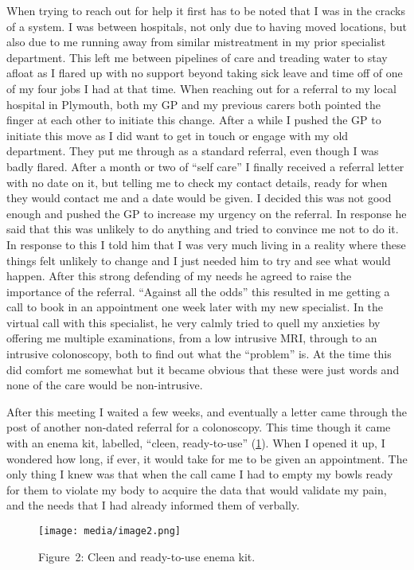 When trying to reach out for help it first has to be noted that I was in
the cracks of a system. I was between hospitals, not only due to having
moved locations, but also due to me running away from similar
mistreatment in my prior specialist department. This left me between
pipelines of care and treading water to stay afloat as I flared up with
no support beyond taking sick leave and time off of one of my four jobs
I had at that time. When reaching out for a referral to my local
hospital in Plymouth, both my GP and my previous carers both pointed the
finger at each other to initiate this change. After a while I pushed the
GP to initiate this move as I did want to get in touch or engage with my
old department. They put me through as a standard referral, even though
I was badly flared. After a month or two of ``self care'' I finally
received a referral letter with no date on it, but telling me to check
my contact details, ready for when they would contact me and a date
would be given. I decided this was not good enough and pushed the GP to
increase my urgency on the referral. In response he said that this was
unlikely to do anything and tried to convince me not to do it. In
response to this I told him that I was very much living in a reality
where these things felt unlikely to change and I just needed him to try
and see what would happen. After this strong defending of my needs he
agreed to raise the importance of the referral. ``Against all the odds''
this resulted in me getting a call to book in an appointment one week
later with my new specialist. In the virtual call with this specialist,
he very calmly tried to quell my anxieties by offering me multiple
examinations, from a low intrusive MRI, through to an intrusive
colonoscopy, both to find out what the ``problem'' is. At the time this
did comfort me somewhat but it became obvious that these were just words
and none of the care would be non-intrusive.

After this meeting I waited a few weeks, and eventually a letter came
through the post of another non-dated referral for a colonoscopy. This
time though it came with an enema kit, labelled, ``cleen, ready-to-use''
(\cref{fig:cleen}). When I opened it up, I wondered how long, if ever,
it would take for me to be given an appointment. The only thing I knew
was that when the call came I had to empty my bowls ready for them to
violate my body to acquire the data that would validate my pain, and the
needs that I had already informed them of verbally.

\begin{figure}
\hypertarget{fig:cleen}{%
\centering
\texttt{[image: media/image2.png]}
\caption{Figure~2: Cleen and ready-to-use enema kit.}\label{fig:cleen}
}
\end{figure}

